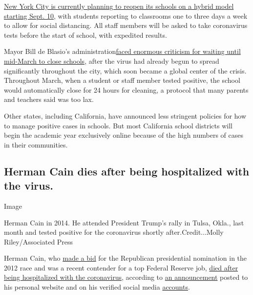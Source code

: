 \href{https://www.nytimes3xbfgragh.onion/2020/07/08/nyregion/nyc-schools-reopening-plan.html}{New
York City is currently planning to reopen its schools on a hybrid model
starting Sept. 10}, with students reporting to classrooms one to three
days a week to allow for social distancing. All staff members will be
asked to take coronavirus tests before the start of school, with
expedited results.

Mayor Bill de Blasio's
administration\href{https://www.nytimes3xbfgragh.onion/2020/07/06/nyregion/nyc-school-reopening-plan.html}{faced
enormous criticism for waiting until mid-March to close schools}, after
the virus had already begun to spread significantly throughout the city,
which soon became a global center of the crisis. Throughout March, when
a student or staff member tested positive, the school would
automatically close for 24 hours for cleaning, a protocol that many
parents and teachers said was too lax.

Other states, including California, have announced less stringent
policies for how to manage positive cases in schools. But most
California school districts will begin the academic year exclusively
online because of the high numbers of cases in their communities.

\hypertarget{herman-cain-dies-after-being-hospitalized-with-the-virus}{%
\subsection{Herman Cain dies after being hospitalized with the
virus.}\label{herman-cain-dies-after-being-hospitalized-with-the-virus}}

Image

Herman Cain in 2014. He attended President Trump's rally in Tulsa,
Okla., last month and tested positive for the coronavirus shortly
after.Credit...Molly Riley/Associated Press

Herman Cain, who
\href{https://www.nytimes3xbfgragh.onion/2011/12/04/us/politics/herman-cain-suspends-his-presidential-campaign.html}{made
a bid} for the Republican presidential nomination in the 2012 race and
was a recent contender for a top Federal Reserve job,
\href{https://www.nytimes3xbfgragh.onion/2020/07/30/us/politics/herman-cain-dead.html}{died
after being hospitalized with the coronavirus}, according to
\href{https://hermancain.com/heartbroken-world-poorer-herman-cain-gone-lord/?ff_source=twitter\&ff_medium=thenewvoice\&ff_content=2020-07-30}{an
announcement} posted to his personal website and on his verified social
media \href{https://twitter.com/THEHermanCain}{accounts}.

